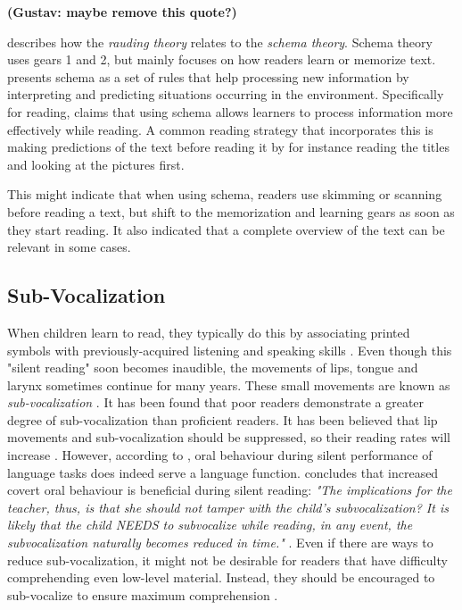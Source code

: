 \textbf{(Gustav: maybe remove this quote?)}

\citeauthor{carver_reading_1992} describes how the \textit{rauding theory} relates to the \textit{schema theory}. Schema theory uses gears 1 and 2, but mainly focuses on how readers learn or memorize text.  presents schema as a set of rules that help processing new information by interpreting and predicting situations occurring in the environment. Specifically for reading, \citeauthor{widmayer_schema_2005} claims that using schema allows learners to process information more effectively while reading. A common reading strategy that incorporates this is making predictions of the text before reading it by for instance reading the titles and looking at the pictures first.

This might indicate that when using schema, readers use skimming or scanning before reading a text, but shift to the memorization and learning gears as soon as they start reading. It also indicated that a complete overview of the text can be relevant in some cases.


\subsection{Sub-Vocalization}
When children learn to read, they typically do this by associating printed symbols with previously-acquired listening and speaking skills \cite{bruinsma_should_1980}. Even though this "silent reading" soon becomes inaudible, the movements of lips, tongue and larynx sometimes continue for many years. These small movements are known as \textit{sub-vocalization} \cite{bruinsma_should_1980}. It has been found that poor readers demonstrate a greater degree of sub-vocalization than proficient readers. It has been believed that lip movements and sub-vocalization should be suppressed, so their reading rates will increase \cite{bruinsma_should_1980}. However, according to , oral behaviour during silent performance of language tasks does indeed serve a language function. \citeauthor{j_covert_1970} concludes that increased covert oral behaviour is beneficial during silent reading: \emph{"The implications for the teacher, thus, is that she should not tamper with the child's subvocalization? It is likely that the child NEEDS to subvocalize while reading, in any event, the subvocalization naturally becomes reduced in time."} \cite{bruinsma_should_1980}. Even if there are ways to reduce sub-vocalization, it might not be desirable for readers that have difficulty comprehending even low-level material. Instead, they should be encouraged to sub-vocalize to ensure maximum comprehension \cite{bruinsma_should_1980}.

